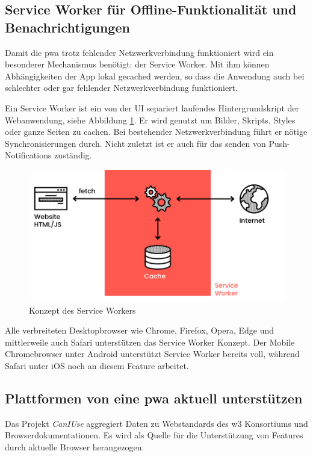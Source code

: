 \subsection{Service Worker für Offline-Funktionalität und Benachrichtigungen}
\label{chap:service_worker}

Damit die \ac{pwa} trotz fehlender Netzwerkverbindung funktioniert wird ein besonderer Mechanismus benötigt: der Service Worker. Mit ihm können Abhängigkeiten der App lokal gecached werden, so dass die Anwendung auch bei schlechter oder gar fehlender Netzwerkverbindung funktioniert. \cite[S. 7]{BeginningPWA}

Ein Service Worker ist ein von der UI separiert laufendes Hintergrundskript der Webanwendung, siehe Abbildung \ref{fig:serviceWorker}. Er wird genutzt um Bilder, Skripts, Styles oder ganze Seiten zu cachen. Bei bestehender Netzwerkverbindung führt er nötige Synchronisierungen durch. Nicht zuletzt ist er auch für das senden von Push-Notifications zuständig. \cite[S. 24]{BeginningPWA}

\begin{figure}[h]
        \includegraphics[width=\linewidth]{img/ServiceWorker-8a0968f1b295f1ff.png}
        \centering
        \caption{Konzept des Service Workers \cite{ServiceWorkerDiagramm}}
        \label{fig:serviceWorker}
\end{figure}


Alle verbreiteten Desktopbrowser wie Chrome, Firefox, Opera, Edge und mittlerweile auch Safari unterstützen das Service Worker Konzept. Der Mobile Chromebrowser unter Android unterstützt Service Worker bereits voll, während Safari unter iOS noch an diesem Feature arbeitet. \cite[S. 9]{BeginningPWA}


\subsection{Plattformen von eine \ac{pwa} aktuell unterstützen}
Das Projekt \textit{CanIUse} aggregiert Daten zu Webstandards des w3 Konsortiums und Browserdokumentationen. Es wird als Quelle für die Unterstützung von Features durch aktuelle Browser herangezogen.

